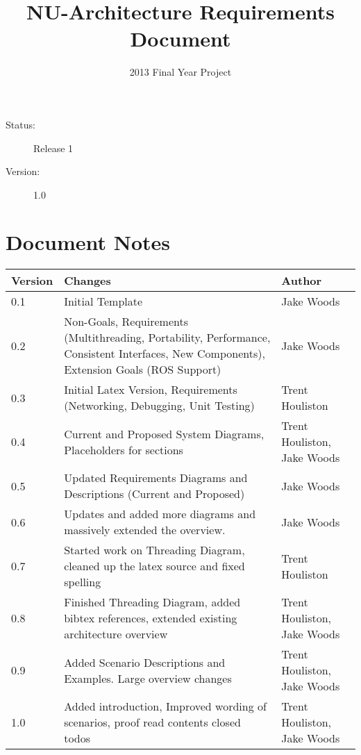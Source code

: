 \documentclass[english,12pt]{scrartcl}
\title{NU-Architecture Requirements Document}
\author{2013 Final Year Project}
\begin{document}
	\maketitle
	\vfill
	{\large
		\begin{description}
			\item [Status:] Release 1
			\item [Version:] 1.0
		\end{description}}

	\clearpage
	\tableofcontents

	\section{Document Notes}
		\begin{tabular}{ p{} | p{} | p{} }
			\textbf{Version} & \textbf{Changes} & \textbf{Author} \\
			\hline

			0.1 &
			Initial Template &
			Jake Woods \\
			\hline

			0.2 &
			Non-Goals, Requirements (Multithreading, Portability, Performance, Consistent
			Interfaces, New Components), Extension Goals (ROS Support) &
			Jake Woods \\
			\hline

			0.3 &
			Initial Latex Version, Requirements (Networking, Debugging, Unit Testing) &
			Trent Houliston \\
			\hline

			0.4 &
			Current and Proposed System Diagrams, Placeholders for sections &
			Trent Houliston, Jake Woods \\
			\hline

			0.5 &
			Updated Requirements Diagrams and Descriptions (Current and Proposed) &
			Jake Woods \\
			\hline

			0.6 &
			Updates and added more diagrams and massively extended the overview. &
			Jake Woods \\
			\hline

			0.7 &
			Started work on Threading Diagram, cleaned up the latex source and fixed spelling &
			Trent Houliston \\
			\hline

			0.8 &
			Finished Threading Diagram, added bibtex references, extended existing architecture
			overview &
			Trent Houliston, Jake Woods \\
			\hline
			
			0.9 &
			Added Scenario Descriptions and Examples. Large overview changes &
			Trent Houliston, Jake Woods \\
			\hline
			
			1.0 &
			Added introduction, Improved wording of scenarios, proof read contents closed todos &
			Trent Houliston, Jake Woods \\
			\hline
		\end{tabular}
		
\end{document}
